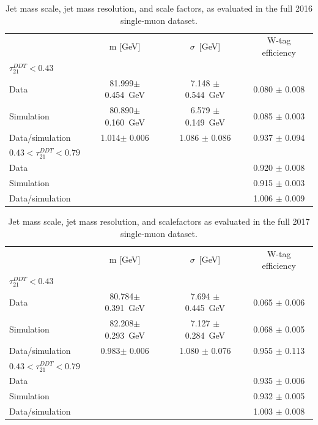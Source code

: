  \begin{table}[h!]
    \centering
    \begin{tabular}{|lccc|}
    \hline
    & m [GeV]           & $\sigma$~[GeV]     & W-tag efficiency\\
    $\tau_{21}^{DDT} < 0.43$ & &&\\ \hline
    \hline
    Data            & 81.999$\pm$ 0.454~GeV   & 7.148 $\pm$ 0.544~GeV & 0.080 $\pm$ 0.008\\
    Simulation      & 80.890$\pm$ 0.160~GeV   & 6.579 $\pm$ 0.149~GeV & 0.085 $\pm$ 0.003\\
    \hline
    Data/simulation & 1.014$\pm$ 0.006       & 1.086 $\pm$ 0.086     & 0.937 $\pm$ 0.094\\
    \hline
    $0.43 < \tau_{21}^{DDT} < 0.79$ & &&\\ \hline
    \hline
    Data            &    &  & 0.920 $\pm$ 0.008\\
    Simulation      &    &  & 0.915 $\pm$ 0.003\\
    \hline
    Data/simulation &    &   & 1.006 $\pm$ 0.009\\
    \hline
    \end{tabular}
     \caption{Jet mass scale, jet mass resolution, and \ddt scale factors, as evaluated in the full 2016 single-muon dataset.}
    \label{tab:wsf16}
 \end{table}
 \begin{table}[htbp]
    \centering
    \begin{tabular}{|lccc|}
    \hline
    & m [GeV]           & $\sigma$~[GeV]     & W-tag efficiency\\
    $\tau_{21}^{DDT} < 0.43$ & &&\\ \hline
    \hline
    Data            & 80.784$\pm$ 0.391~GeV   & 7.694 $\pm$ 0.445~GeV & 0.065 $\pm$ 0.006\\
    Simulation      & 82.208$\pm$ 0.293~GeV   & 7.127 $\pm$ 0.284~GeV & 0.068 $\pm$ 0.005\\
    \hline
    Data/simulation & 0.983$\pm$ 0.006       & 1.080 $\pm$ 0.076     & 0.955 $\pm$ 0.113\\
    \hline
    $0.43 < \tau_{21}^{DDT} < 0.79$ & &&\\ \hline
    \hline
    Data            &    &  & 0.935 $\pm$ 0.006\\
    Simulation      &    &  & 0.932 $\pm$ 0.005\\
    \hline
    Data/simulation &    &   & 1.003 $\pm$ 0.008\\
    \hline
    \end{tabular}
    \caption{Jet mass scale, jet mass resolution, and \ddt scalefactors as evaluated in the full 2017 single-muon dataset.}
    \label{tab:wsf}
 \end{table}
